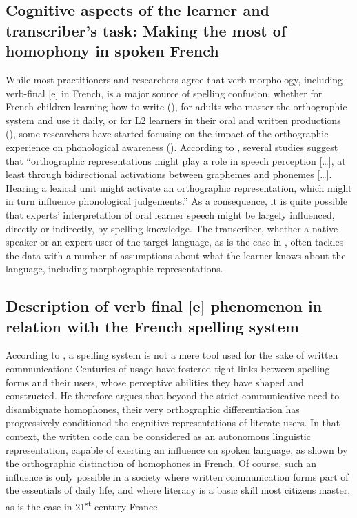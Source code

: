 \documentclass[output=paper,colorlinks,citecolor=brown,modfonts,nonflat]{../langscibook}
\begin{document}
\subsection{ \textbf{Cognitive aspects of the learner and transcriber’s task: Making the most of homophony in spoken French}}%

While most practitioners and researchers agree that verb morphology, including verb-final [e] in French, is a major source of spelling confusion, whether for French children learning how to write (\citealt{BrissaudSandon1999,DavidEtAl2006,FayolPacton2006}), for adults who master the orthographic system and use it daily, or for L2 learners in their oral and written productions (\citealt{DavidEtAl2006,BrissaudEtAl2006,Prévost2007French,Granget2015}), some researchers have started focusing on the impact of the orthographic experience on phonological awareness (\citealt{BassettiEtAl2015,NimzKhattab2019}). According to \citet[68]{DeteyNespoulous2008}, several studies suggest that “orthographic representations might play a role in speech perception […], at least through bidirectional activations between graphemes and phonemes […]. Hearing a lexical unit might activate an orthographic representation, which might in turn influence phonological judgements.” As a consequence, it is quite possible that experts’ interpretation of oral learner speech might be largely influenced, directly or indirectly, by spelling knowledge. The transcriber, whether a native speaker or an expert user of the target language, as is the case in , often tackles the data with a number of assumptions about what the learner knows about the language, including morphographic representations.

\subsection{ \textbf{Description of verb final [e] phenomenon in relation with the French spelling system}}%

According to \citet[25]{Jaffré2006}, a spelling system is not a mere tool used for the sake of written communication: Centuries of usage have fostered tight links between spelling forms and their users, whose perceptive abilities they have shaped and constructed. He therefore argues that beyond the strict communicative need to disambiguate homophones, their very orthographic differentiation has progressively conditioned the cognitive representations of literate users. In that context, the written code can be considered as an autonomous linguistic representation, capable of exerting an influence on spoken language, as shown by the orthographic distinction of homophones in French. Of course, such an influence is only possible in a society where written communication forms part of the essentials of daily life, and where literacy is a basic skill most citizens master, as is the case in 21\textsuperscript{st} century France.
\end{document}
